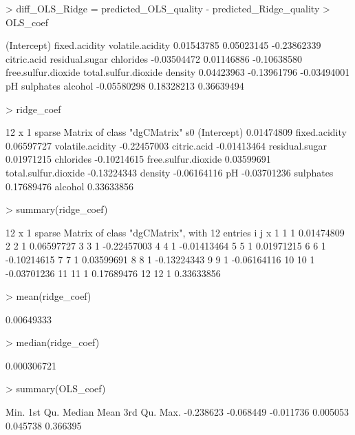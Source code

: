 \documentclass{article}
\begin{document}
\begin{Schunk}
\begin{Sinput}
> diff_OLS_Ridge = predicted_OLS_quality - predicted_Ridge_quality
> OLS_coef
\end{Sinput}
\begin{Soutput}
         (Intercept)        fixed.acidity     volatile.acidity 
          0.01543785           0.05023145          -0.23862339 
         citric.acid       residual.sugar            chlorides 
         -0.03504472           0.01146886          -0.10638580 
 free.sulfur.dioxide total.sulfur.dioxide              density 
          0.04423963          -0.13961796          -0.03494001 
                  pH            sulphates              alcohol 
         -0.05580298           0.18328213           0.36639494 
\end{Soutput}
\begin{Sinput}
> ridge_coef
\end{Sinput}
\begin{Soutput}
12 x 1 sparse Matrix of class "dgCMatrix"
                              s0
(Intercept)           0.01474809
fixed.acidity         0.06597727
volatile.acidity     -0.22457003
citric.acid          -0.01413464
residual.sugar        0.01971215
chlorides            -0.10214615
free.sulfur.dioxide   0.03599691
total.sulfur.dioxide -0.13224343
density              -0.06164116
pH                   -0.03701236
sulphates             0.17689476
alcohol               0.33633856
\end{Soutput}
\begin{Sinput}
> summary(ridge_coef)
\end{Sinput}
\begin{Soutput}
12 x 1 sparse Matrix of class "dgCMatrix", with 12 entries 
    i j           x
1   1 1  0.01474809
2   2 1  0.06597727
3   3 1 -0.22457003
4   4 1 -0.01413464
5   5 1  0.01971215
6   6 1 -0.10214615
7   7 1  0.03599691
8   8 1 -0.13224343
9   9 1 -0.06164116
10 10 1 -0.03701236
11 11 1  0.17689476
12 12 1  0.33633856
\end{Soutput}
\begin{Sinput}
> mean(ridge_coef)
\end{Sinput}
\begin{Soutput}
[1] 0.00649333
\end{Soutput}
\begin{Sinput}
> median(ridge_coef)
\end{Sinput}
\begin{Soutput}
[1] 0.000306721
\end{Soutput}
\begin{Sinput}
> summary(OLS_coef)
\end{Sinput}
\begin{Soutput}
     Min.   1st Qu.    Median      Mean   3rd Qu.      Max. 
-0.238623 -0.068449 -0.011736  0.005053  0.045738  0.366395 
\end{Soutput}
\end{Schunk}
\end{document}
